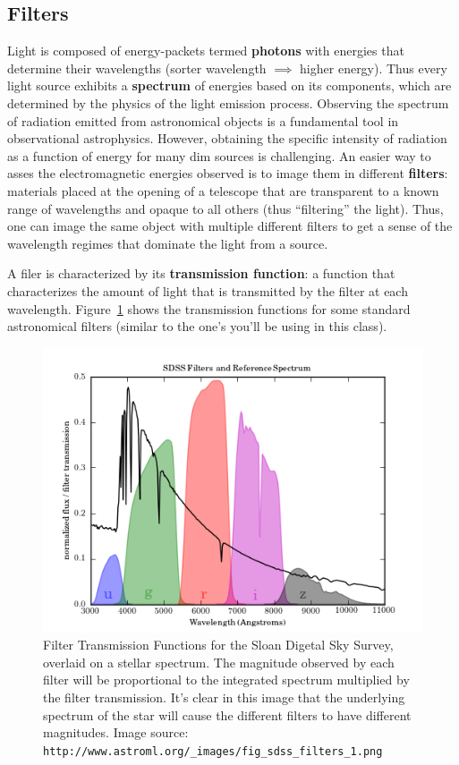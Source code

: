 \subsection{Filters}
Light is composed of energy-packets termed \textbf{photons} with energies that determine their wavelengths (sorter wavelength $\implies$ higher energy). Thus every light source exhibits a \textbf{spectrum} of energies based on its components, which are determined by the physics of the light emission process. Observing the spectrum of radiation emitted from astronomical objects is a fundamental tool in observational astrophysics. However, obtaining the specific intensity of radiation as a function of energy for many dim sources is challenging. An easier way to asses the electromagnetic energies observed is to image them in different \textbf{filters}: materials placed at the opening of a telescope that are transparent to a known range of wavelengths and opaque to all others (thus ``filtering'' the light). Thus, one can image the same object with multiple different filters to get a sense of the wavelength regimes that dominate the light from a source.

A filer is characterized by its \textbf{transmission function}: a function that characterizes the amount of light that is transmitted by the filter at each wavelength. Figure~\ref{sdss_filters} shows the transmission functions for some standard astronomical filters (similar to the one's you'll be using in this class).

\begin{figure}
\label{sdss_filters}
\includegraphics{hr_diagram/fig_sdss_filters_1.png}
\caption{Filter Transmission Functions for the Sloan Digetal Sky Survey, overlaid on a stellar spectrum. The magnitude observed by each filter will be proportional to the integrated spectrum multiplied by the filter transmission. It's clear in this image that the underlying spectrum of the star will cause the different filters to have different magnitudes. Image source: \texttt{http://www.astroml.org/\_images/fig\_sdss\_filters\_1.png}}
\end{figure}

